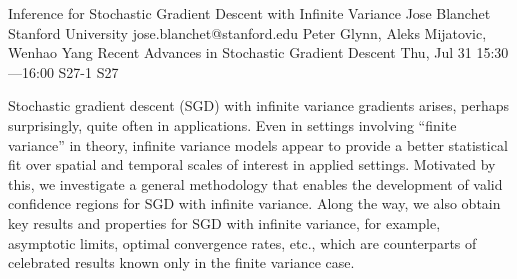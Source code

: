 \begin{talk}
  {Inference for Stochastic Gradient Descent with Infinite Variance}%
  {Jose Blanchet}%
  {Stanford University}%
  {jose.blanchet@stanford.edu}%
  {Peter Glynn, Aleks Mijatovic, Wenhao Yang}%
  {Recent Advances in Stochastic Gradient Descent}%
  {Thu, Jul 31 15:30---16:00}%
  {S27-1}%
  {S27}%
    
                
Stochastic gradient descent (SGD) with infinite variance gradients arises, perhaps surprisingly, quite often in applications. Even in settings involving “finite variance” in theory, infinite variance models appear to provide a better statistical fit over spatial and temporal scales of interest in applied settings. Motivated by this, we investigate a general methodology that enables the development of valid confidence regions for SGD with infinite variance. Along the way, we also obtain key results and properties for SGD with infinite variance, for example, asymptotic limits, optimal convergence rates, etc., which are counterparts of celebrated results known only in the finite variance case.


\medskip


\end{talk}

